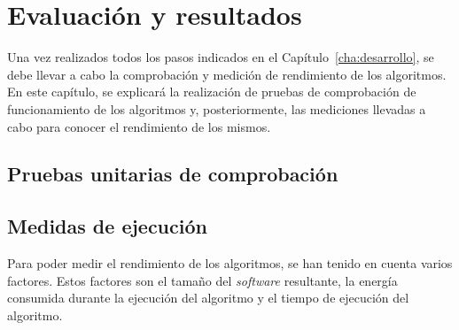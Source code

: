 %
%
%
% 
%
%
%
%

\chapter{Evaluación y resultados}\label{cha:resultados}

Una vez realizados todos los pasos indicados en el Capítulo~\ref{cha:desarrollo}, se debe llevar a cabo la comprobación y medición de rendimiento de los algoritmos.
En este capítulo, se explicará la realización de pruebas de comprobación de funcionamiento de los algoritmos y, posteriormente, las mediciones llevadas a cabo para conocer el rendimiento de los mismos.

\section{Pruebas unitarias de comprobación}\label{sec:unitarias}



\section{Medidas de ejecución}\label{sec:medidas}

Para poder medir el rendimiento de los algoritmos, se han tenido en cuenta varios factores.
Estos factores son el tamaño del \textit{software} resultante, la energía consumida durante la ejecución del algoritmo y el tiempo de ejecución del algoritmo.

